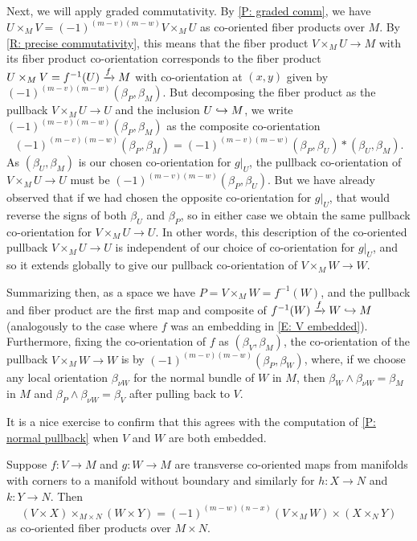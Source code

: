 \begin{example}
	Next, we will apply graded commutativity.
	By \cref{P: graded comm}, we have $U \times_M V = (-1)^{(m-v)(m-w)}V \times_M U$ as co-oriented fiber products over $M$.
	By \cref{R: precise commutativity}, this means that the fiber product $V \times_M U \to M$ with its fiber product co-orientation corresponds to the fiber product $U \times_M V = f^{-1}(U) \xrightarrow{f} M$ with co-orientation at $(x,y)$ given by $(-1)^{(m-v)(m-w)}(\beta_P, \beta_M)$.
	But decomposing the fiber product as the pullback $V \times_M U \to U$ and the inclusion $U \hookrightarrow M$, we write $(-1)^{(m-v)(m-w)}(\beta_P, \beta_M)$ as the composite co-orientation
	$$(-1)^{(m-v)(m-w)}(\beta_P, \beta_M) = (-1)^{(m-v)(m-w)}(\beta_P, \beta_U)*(\beta_U, \beta_M).$$
	As $(\beta_U, \beta_M)$ is our chosen co-orientation for $g|_U$, the pullback co-orientation of $V \times_M U \to U$ must be $(-1)^{(m-v)(m-w)}(\beta_P, \beta_U)$.
	But we have already observed that if we had chosen the opposite co-orientation for $g|_U$, that would reverse the signs of both $\beta_U$ and $\beta_P$, so in either case we obtain the same pullback co-orientation for $V \times_M U \to U$.
	In other words, this description of the co-oriented pullback $V \times_M U \to U$ is independent of our choice of co-orientation for $g|_U$, and so it extends globally to give our pullback co-orientation of $V \times_M W \to W$.

	Summarizing then, as a space we have $P = V \times_M W = f^{-1}(W)$, and the pullback and fiber product are the first map and composite of $f^{-1}(W) \xrightarrow{f} W \hookrightarrow M$ (analogously to the case where $f$ was an embedding in \cref{E: V embedded}).
	Furthermore, fixing the co-orientation of $f$ as $(\beta_V, \beta_M)$, the co-orientation of the pullback $V \times_M W \to W$ is by $(-1)^{(m-v)(m-w)}(\beta_P, \beta_W)$, where, if we choose any local orientation $\beta_{\nu W}$ for the normal bundle of $W$ in $M$, then $\beta_W \wedge \beta_{\nu W} = \beta_M$ in $M$ and $\beta_P \wedge \beta_{\nu W} = \beta_V$ after pulling back to $V$.

	It is a nice exercise to confirm that this agrees with the computation of \cref{P: normal pullback} when $V$ and $W$ are both embedded.
\end{example}

\begin{corollary}\label{C: criss cross}
	Suppose $f \colon V \to M$ and $g \colon W \to M$ are transverse co-oriented maps from manifolds with corners to a manifold without boundary and similarly for $h \colon X \to N$ and $k \colon Y \to N$.
	Then$$(V \times X)\times_{M \times N} (W \times Y) = (-1)^{(m-w)(n-x)} (V \times_M W) \times (X \times_N Y) $$
	as co-oriented fiber products over $M \times N$.
\end{corollary}

